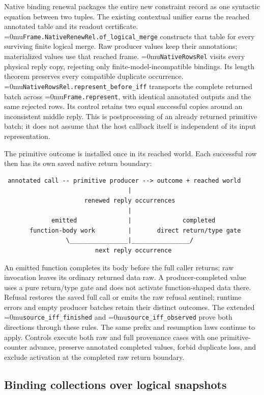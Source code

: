 \documentclass[11pt,a4paper]{article}
\newcommand{\name}[1]{\textup{\Urlmuskip=0mu\relax\nolinkurl{#1}}}
\begin{document}
Native binding renewal packages the entire new constraint record as one
syntactic equation between two tuples. The existing contextual unifier earns
the reached annotated table and its readout certificate.
\name{Frame.NativeRenewRel.of_logical_merge} constructs that table for every
surviving finite logical merge. Raw producer values keep their annotations;
materialized values use that reached frame. \name{NativeRowsRel} visits every
physical reply copy, rejecting only finite-model-incompatible bindings.
Its length theorem preserves every compatible duplicate occurrence.
\name{NativeRowsRel.represent_before_iff} transports the complete returned
batch across \name{Frame.represent}, with identical annotated outputs and
the same rejected rows. Its control retains two equal successful copies
around an inconsistent middle reply. This is postprocessing of an already
returned primitive batch; it does not assume that the host callback itself
is independent of its input representation.

The primitive outcome is installed once in its reached world. Each successful
row then has its own saved native return boundary:
\begin{verbatim}
 annotated call -- primitive producer --> outcome + reached world
                                  |
                      renewed reply occurrences
                                  |
             emitted              |              completed
       function-body work         |       direct return/type gate
                 \________________|________________/
                         next reply occurrence
\end{verbatim}
An emitted function completes its body before the full caller returns; raw
invocation leaves its ordinary returned data raw. A producer-completed value
uses a pure return/type gate and does not activate function-shaped data there.
Refusal restores the saved full call or emits the raw refusal sentinel;
runtime errors and empty producer batches retain their distinct outcomes.
The extended \name{source_iff_finished} and \name{source_iff_observed} prove
both directions through these rules. The same prefix and resumption laws
continue to apply. Controls execute both raw and full provenance cases with
one primitive-counter advance, preserve annotated completed values, forbid
duplicate loss, and exclude activation at the completed raw return boundary.

\subsection{Binding collections over logical snapshots}
\end{document}
